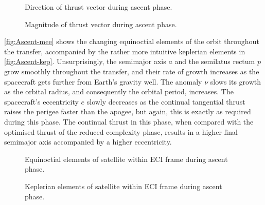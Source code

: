 \begin{figure}
\caption{Direction of thrust vector during ascent phase.} \label{fig:Ascent-thrust}
\centering
\def\svgwidth{\figurewidth}

\end{figure}

\begin{figure}
\caption{Magnitude of thrust vector during ascent phase.} \label{fig:Ascent-thrustM}
\centering
\def\svgwidth{\figurewidth}

\end{figure}

\autoref{fig:Ascent-mee} shows the changing equinoctial elements of the orbit throughout the transfer, accompanied by the rather more intuitive keplerian elements in \autoref{fig:Ascent-kep}. Unsurprisingly, the semimajor axis $a$ and the semilatus rectum $p$ grow smoothly throughout the transfer, and their rate of growth increases as the spacecraft gets further from Earth's gravity well. The anomaly $\nu$ slows its growth as the orbital radius, and consequently the orbital period, increases. The spacecraft's eccentricity $e$ slowly decreases as the continual tangential thrust raises the perigee faster than the apogee, but again, this is exactly as required during this phase. The continual thrust in this phase, when compared with the optimised thrust of the reduced complexity phase, results in a higher final semimajor axis accompanied by a higher eccentricity.

\begin{figure}
\caption{Equinoctial elements of satellite within ECI frame during ascent phase.} \label{fig:Ascent-mee}
\centering
\def\svgwidth{\figurewidth}

\end{figure}

\begin{figure}
\caption{Keplerian elements of satellite within ECI frame during ascent phase.} \label{fig:Ascent-kep}
\centering
\def\svgwidth{\figurewidth}

\end{figure}

